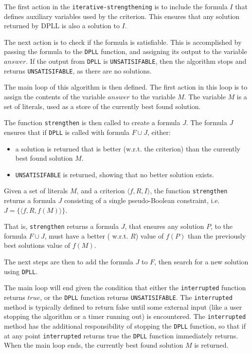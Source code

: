 The first action in the \texttt{iterative-strengthening} is to include the formula $I$ that defines auxiliary variables used by the criterion.
This ensures that any solution returned by DPLL is also a solution to $I$.

The next action is to check if the formula is satisfiable.
This is accomplished by passing the formula to the \texttt{DPLL} function, and assigning its output to the variable $answer$.
If the output from \texttt{DPLL} is \texttt{UNSATISIFABLE}, then the algorithm stops and returns \texttt{UNSATISIFABLE}, as there are no solutions.

The main loop of this algorithm is then defined.
The first action in this loop is to assign the contents of the variable $answer$ to the variable $M$.
The variable $M$ is a set of literals, used as a store of the currently best found solution.

The function \texttt{strengthen} is then called to create a formula $J$.
The formula $J$ ensures that if \texttt{DPLL} is called with formula $F \cup J$, either:
\begin{itemize}
  \item a solution is returned that is better (w.r.t. the criterion) than the currently best found solution $M$. 
  \item \texttt{UNSATISIFABLE} is returned, showing that no better solution exists.
\end{itemize}

\begin{defs}
Given a set of literals $M$, and a criterion $\langle f, R, I \rangle$,
the function \texttt{strengthen} returns a formula $J$ consisting of a single pseudo-Boolean constraint, i.e. $ J = \{ \langle f,R,f(M) \rangle \}$.
\end{defs}
That is, \texttt{strengthen} returns a formula $J$,
that ensures any solution $P$, to the formula $F \cup J$, must have a better ( w.r.t. $R$) value of $f(P)$ than the previously best solutions value of $f(M)$.

The next steps are then to add the formula $J$ to $F$, then search for a new solution using \texttt{DPLL}.

The main loop will end given the condition that either the \texttt{interrupted} function returns $true$, or the \texttt{DPLL} function returns \texttt{UNSATISIFABLE}.
The \texttt{interrupted} method is typically defined to return false until some external input (like a user stopping the algorithm or a timer running out) is encountered.
The \texttt{interrupted} method has the additional responsibility of stopping the \texttt{DPLL} function, 
so that if at any point \texttt{interrupted} returns true the \texttt{DPLL} function immediately returns.
When the main loop ends, the currently best found solution $M$ is returned.

